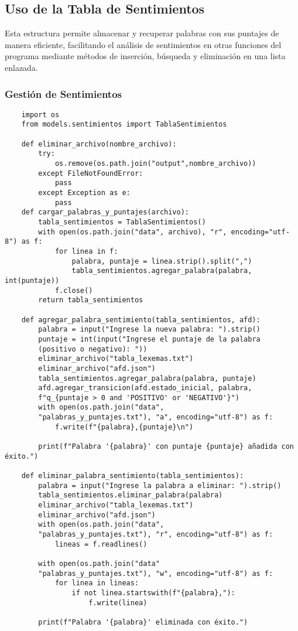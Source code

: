 \documentclass[12pt,a4paper]{article}
\begin{document}
\subsection*{Uso de la Tabla de Sentimientos}
Esta estructura permite almacenar y recuperar palabras con sus puntajes de manera eficiente, facilitando el análisis de sentimientos en otras funciones del programa mediante métodos de inserción, búsqueda y eliminación en una lista enlazada.
\subsubsection{Gestión de Sentimientos}

\begin{verbatim}
    import os
    from models.sentimientos import TablaSentimientos
    
    def eliminar_archivo(nombre_archivo):
        try:
            os.remove(os.path.join("output",nombre_archivo))
        except FileNotFoundError:
            pass
        except Exception as e:
            pass
    def cargar_palabras_y_puntajes(archivo):
        tabla_sentimientos = TablaSentimientos()
        with open(os.path.join("data", archivo), "r", encoding="utf-8") as f:
            for linea in f:
                palabra, puntaje = linea.strip().split(",")
                tabla_sentimientos.agregar_palabra(palabra, int(puntaje))
            f.close()    
        return tabla_sentimientos
    
    def agregar_palabra_sentimiento(tabla_sentimientos, afd):
        palabra = input("Ingrese la nueva palabra: ").strip()
        puntaje = int(input("Ingrese el puntaje de la palabra 
        (positivo o negativo): "))
        eliminar_archivo("tabla_lexemas.txt")
        eliminar_archivo("afd.json")    
        tabla_sentimientos.agregar_palabra(palabra, puntaje)        
        afd.agregar_transicion(afd.estado_inicial, palabra, 
        f"q_{puntaje > 0 and 'POSITIVO' or 'NEGATIVO'}")        
        with open(os.path.join("data",
        "palabras_y_puntajes.txt"), "a", encoding="utf-8") as f:
            f.write(f"{palabra},{puntaje}\n")
        
        print(f"Palabra '{palabra}' con puntaje {puntaje} añadida con éxito.")
    
    def eliminar_palabra_sentimiento(tabla_sentimientos):
        palabra = input("Ingrese la palabra a eliminar: ").strip()
        tabla_sentimientos.eliminar_palabra(palabra)
        eliminar_archivo("tabla_lexemas.txt")
        eliminar_archivo("afd.json")
        with open(os.path.join("data",
        "palabras_y_puntajes.txt"), "r", encoding="utf-8") as f:
            lineas = f.readlines()
        
        with open(os.path.join("data"
        "palabras_y_puntajes.txt"), "w", encoding="utf-8") as f:
            for linea in lineas:
                if not linea.startswith(f"{palabra},"):
                    f.write(linea)
    
        print(f"Palabra '{palabra}' eliminada con éxito.")
        
\end{verbatim}
\end{document}
